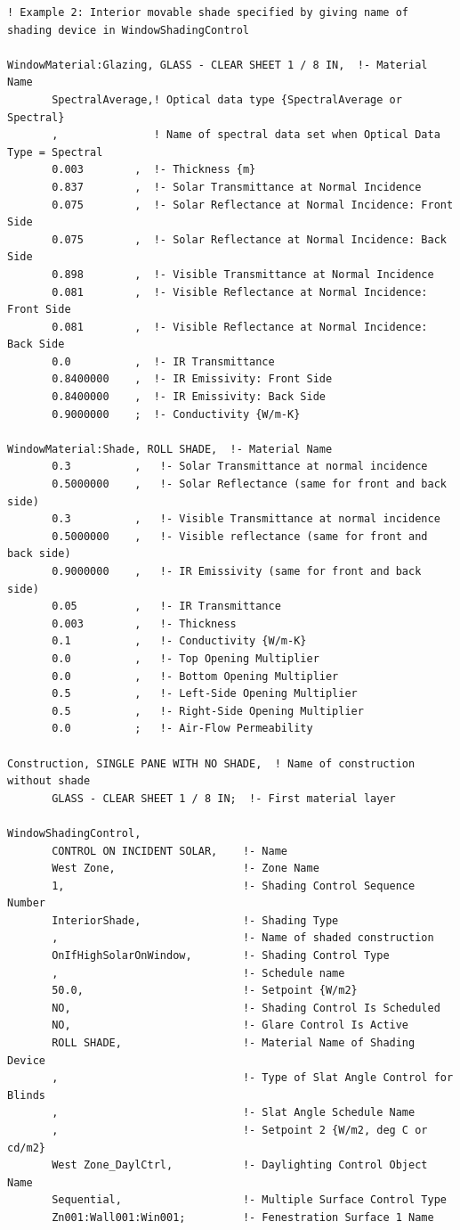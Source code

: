 \begin{lstlisting}
! Example 2: Interior movable shade specified by giving name of shading device in WindowShadingControl

WindowMaterial:Glazing, GLASS - CLEAR SHEET 1 / 8 IN,  !- Material Name
       SpectralAverage,! Optical data type {SpectralAverage or Spectral}
       ,               ! Name of spectral data set when Optical Data Type = Spectral
       0.003        ,  !- Thickness {m}
       0.837        ,  !- Solar Transmittance at Normal Incidence
       0.075        ,  !- Solar Reflectance at Normal Incidence: Front Side
       0.075        ,  !- Solar Reflectance at Normal Incidence: Back Side
       0.898        ,  !- Visible Transmittance at Normal Incidence
       0.081        ,  !- Visible Reflectance at Normal Incidence: Front Side
       0.081        ,  !- Visible Reflectance at Normal Incidence: Back Side
       0.0          ,  !- IR Transmittance
       0.8400000    ,  !- IR Emissivity: Front Side
       0.8400000    ,  !- IR Emissivity: Back Side
       0.9000000    ;  !- Conductivity {W/m-K}

WindowMaterial:Shade, ROLL SHADE,  !- Material Name
       0.3          ,   !- Solar Transmittance at normal incidence
       0.5000000    ,   !- Solar Reflectance (same for front and back side)
       0.3          ,   !- Visible Transmittance at normal incidence
       0.5000000    ,   !- Visible reflectance (same for front and back side)
       0.9000000    ,   !- IR Emissivity (same for front and back side)
       0.05         ,   !- IR Transmittance
       0.003        ,   !- Thickness
       0.1          ,   !- Conductivity {W/m-K}
       0.0          ,   !- Top Opening Multiplier
       0.0          ,   !- Bottom Opening Multiplier
       0.5          ,   !- Left-Side Opening Multiplier
       0.5          ,   !- Right-Side Opening Multiplier
       0.0          ;   !- Air-Flow Permeability

Construction, SINGLE PANE WITH NO SHADE,  ! Name of construction without shade
       GLASS - CLEAR SHEET 1 / 8 IN;  !- First material layer

WindowShadingControl,
       CONTROL ON INCIDENT SOLAR,    !- Name
       West Zone,                    !- Zone Name
       1,                            !- Shading Control Sequence Number
       InteriorShade,                !- Shading Type
       ,                             !- Name of shaded construction
       OnIfHighSolarOnWindow,        !- Shading Control Type
       ,                             !- Schedule name
       50.0,                         !- Setpoint {W/m2}
       NO,                           !- Shading Control Is Scheduled
       NO,                           !- Glare Control Is Active
       ROLL SHADE,                   !- Material Name of Shading Device
       ,                             !- Type of Slat Angle Control for Blinds
       ,                             !- Slat Angle Schedule Name
       ,                             !- Setpoint 2 {W/m2, deg C or cd/m2}
       West Zone_DaylCtrl,           !- Daylighting Control Object Name
       Sequential,                   !- Multiple Surface Control Type
       Zn001:Wall001:Win001;         !- Fenestration Surface 1 Name


\end{lstlisting}
